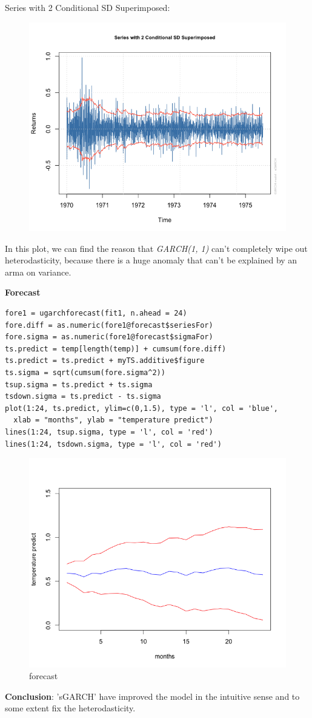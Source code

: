 \documentclass[a4paper, 11pt]{article}
\begin{document}
Series with 2 Conditional SD Superimposed:
\begin{figure}[H]
\centering
\includegraphics[scale=.60]{series_sd.png}
\end{figure}
\indent In this plot, we can find the reason that \textit{GARCH(1, 1)} can't completely wipe out heterodasticity, because there is a huge anomaly that can't be explained by an arma on variance.


\textbf{Forecast}

\begin{verbatim}
fore1 = ugarchforecast(fit1, n.ahead = 24)
fore.diff = as.numeric(fore1@forecast$seriesFor)
fore.sigma = as.numeric(fore1@forecast$sigmaFor)
ts.predict = temp[length(temp)] + cumsum(fore.diff)
ts.predict = ts.predict + myTS.additive$figure
ts.sigma = sqrt(cumsum(fore.sigma^2))
tsup.sigma = ts.predict + ts.sigma
tsdown.sigma = ts.predict - ts.sigma
plot(1:24, ts.predict, ylim=c(0,1.5), type = 'l', col = 'blue',
  xlab = "months", ylab = "temperature predict")
lines(1:24, tsup.sigma, type = 'l', col = 'red')
lines(1:24, tsdown.sigma, type = 'l', col = 'red')
\end{verbatim}

\begin{figure}[H]
\centering
\caption{forecast}
\includegraphics[scale=.60]{predict01.png}
\end{figure}


\textbf{Conclusion}: 'sGARCH' have improved the model in the intuitive sense and to some extent fix the heterodasticity. 
\end{document}
